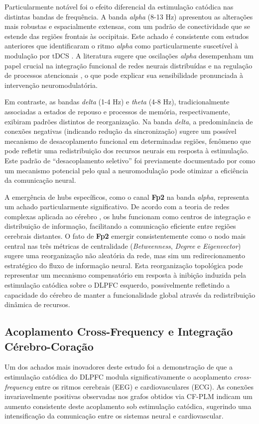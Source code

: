 Particularmente notável foi o efeito diferencial da estimulação catódica nas distintas bandas de frequência. A banda \emph{alpha} (8-13 Hz) apresentou as alterações mais robustas e espacialmente extensas, com um padrão de conectividade que se estende das regiões frontais às occipitais. Este achado é consistente com estudos anteriores que identificaram o ritmo \emph{alpha} como particularmente suscetível à modulação por tDCS \cite{scheler2019neuromodulation}. A literatura sugere que oscilações \emph{alpha} desempenham um papel crucial na integração funcional de redes neurais distribuídas e na regulação de processos atencionais \cite{fries2015rhythms}, o que pode explicar sua sensibilidade pronunciada à intervenção neuromodulatória.

Em contraste, as bandas \emph{delta} (1-4 Hz) e \emph{theta} (4-8 Hz), tradicionalmente associadas a estados de repouso e processos de memória, respectivamente, exibiram padrões distintos de reorganização. Na banda \emph{delta}, a predominância de conexões negativas (indicando redução da sincronização) sugere um possível mecanismo de desacoplamento funcional em determinadas regiões, fenômeno que pode refletir uma redistribuição dos recursos neurais em resposta à estimulação. Este padrão de ``desacoplamento seletivo'' foi previamente documentado por \cite{criscuolo2022cognition} como um mecanismo potencial pelo qual a neuromodulação pode otimizar a eficiência da comunicação neural.

A emergência de hubs específicos, como o canal \textbf{Fp2} na banda \emph{alpha}, representa um achado particularmente significativo. De acordo com a teoria de redes complexas aplicada ao cérebro \cite{bullmore2009complex}, os hubs funcionam como centros de integração e distribuição de informação, facilitando a comunicação eficiente entre regiões cerebrais distantes. O fato de \textbf{Fp2} emergir consistentemente como o nodo mais central nas três métricas de centralidade (\textit{Betweenness}, \textit{Degree} e \textit{Eigenvector}) sugere uma reorganização não aleatória da rede, mas sim um redirecionamento estratégico do fluxo de informação neural. Esta reorganização topológica pode representar um mecanismo compensatório em resposta à inibição induzida pela estimulação catódica sobre o DLPFC esquerdo, possivelmente refletindo a capacidade do cérebro de manter a funcionalidade global através da redistribuição dinâmica de recursos.

\subsection{Acoplamento Cross-Frequency e Integração Cérebro-Coração}
Um dos achados mais inovadores deste estudo foi a demonstração de que a estimulação catódica do DLPFC modula significativamente o acoplamento \textit{cross-frequency} entre os ritmos cerebrais (EEG) e cardiovasculares (ECG). As conexões invariavelmente positivas observadas nos grafos obtidos via CF-PLM indicam um aumento consistente deste acoplamento sob estimulação catódica, sugerindo uma intensificação da comunicação entre os sistemas neural e cardiovascular.

